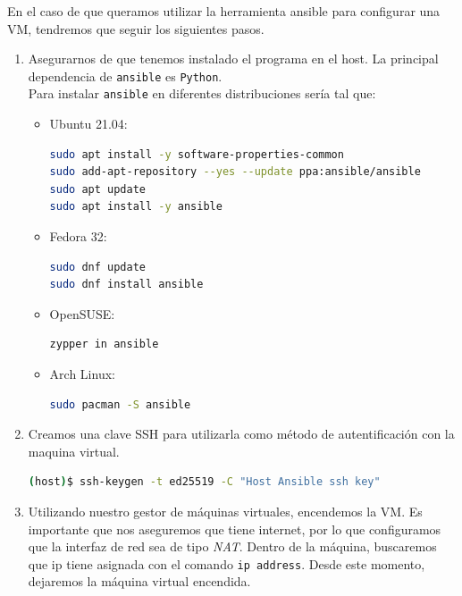 \documentclass[12pt]{article}
\begin{document}
	\noindent En el caso de que queramos utilizar la herramienta ansible para configurar una VM, tendremos que seguir los siguientes pasos.
	\begin{enumerate}
		\item Asegurarnos de que tenemos instalado el programa en el host. La principal dependencia de \texttt{ansible} es \texttt{Python}. \\
		Para instalar \texttt{ansible} en diferentes distribuciones sería tal que:
		\begin{itemize}
			\item Ubuntu 21.04:
			\begin{lstlisting}[language=Bash, caption={Instalación \texttt{ansible} en Ubuntu}]
sudo apt install -y software-properties-common
sudo add-apt-repository --yes --update ppa:ansible/ansible
sudo apt update
sudo apt install -y ansible
			\end{lstlisting}
			
			\item Fedora 32:
			\begin{lstlisting}[language=Bash, caption={Instalación \texttt{ansible} en Fedora}]
sudo dnf update
sudo dnf install ansible
			\end{lstlisting}
			
			\item OpenSUSE:
			\begin{lstlisting}[language=Bash, caption={Instalación \texttt{ansible} en OpenSUSE}]
zypper in ansible
			\end{lstlisting}
			
			\item Arch Linux:
			\begin{lstlisting}[language=Bash, caption={Instalación \texttt{ansible} en Arch Linux}]
sudo pacman -S ansible
			\end{lstlisting} 
		\end{itemize}
		
		\item Creamos una clave SSH para utilizarla como método de autentificación con la maquina virtual. 
		\begin{lstlisting}[language=Bash, caption={Crear clave SSH para autenticación en VM}]
(host)$ ssh-keygen -t ed25519 -C "Host Ansible ssh key"
		\end{lstlisting}
		
		\pagebreak
		
		\item Utilizando nuestro gestor de máquinas virtuales, encendemos la VM. Es importante que nos aseguremos que tiene internet, por lo que configuramos que la interfaz de red sea de tipo \textit{NAT}. Dentro de la máquina, buscaremos que ip tiene asignada con el comando \texttt{ip address}. Desde este momento, dejaremos la máquina virtual encendida.
		

\end{enumerate}
\end{document}
